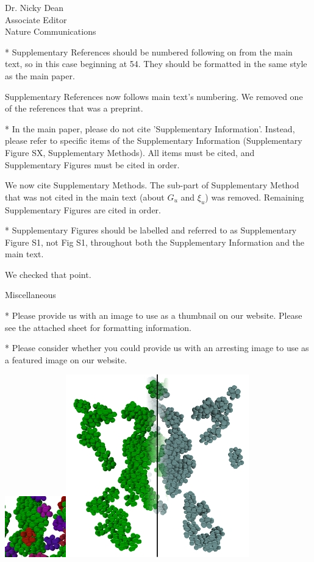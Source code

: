 \documentclass[a4paper, rebuttal, parskip=true, firsthead=false, fromemail=true, foldmarks=false]{scrlttr2}
\begin{document}
\begin{letter}{Dr. Nicky Dean\\
Associate Editor\\
Nature Communications}
\begin{quotationi}
* Supplementary References should be numbered following on from the main text, so in this case beginning at 54. They should be formatted in the same style as the main paper.
\end{quotationi}
Supplementary References now follows main text's numbering. We removed one of the references that was a preprint.


\begin{quotationi}
* In the main paper, please do not cite 'Supplementary Information'. Instead, please refer to specific items of the Supplementary Information (Supplementary Figure SX, Supplementary Methods). All items must be cited, and Supplementary Figures must be cited in order.
\end{quotationi}

We now cite Supplementary Methods. The sub-part of Supplementary Method that was not cited in the main text (about $G_u$ and $\xi_u$) was removed. Remaining Supplementary Figures are cited in order.

\begin{quotationi}
* Supplementary Figures should be labelled and referred to as Supplementary Figure S1, not Fig S1, throughout both the Supplementary Information and the main text.
\end{quotationi}
We checked that point.


\textsf{Miscellaneous}
\begin{quotationi}

* Please provide us with an image to use as a thumbnail on our website. Please see the attached sheet for formatting information.

* Please consider whether you could provide us with an arresting image to use as a featured image on our website.
\end{quotationi}
\includegraphics{thumbnail.jpg}\includegraphics{cover.jpg}


\end{letter}
\end{document}
